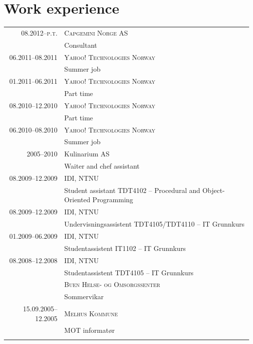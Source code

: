 \documentclass[a4paper,10pt]{article}
\begin{document}
\section{Work experience}
\begin{longtable}{r|p{11cm}}

\textsc{08.2012--p.t.} & \textsc{Capgemini Norge AS} \\
& \footnotesize{Consultant} \\

\textsc{06.2011--08.2011} & \textsc{Yahoo! Technologies Norway} \\
& \footnotesize{Summer job} \\

\textsc{01.2011--06.2011} & \textsc{Yahoo! Technologies Norway} \\
& \footnotesize{Part time} \\

\textsc{08.2010--12.2010} & \textsc{Yahoo! Technologies Norway} \\
& \footnotesize{Part time}\\

\textsc{06.2010--08.2010} & \textsc{Yahoo! Technologies Norway} \\
& \footnotesize{Summer job}\\

\textsc{2005--2010} & Kulinarium AS \\
& \footnotesize{Waiter and chef assistant} \\

\textsc{08.2009--12.2009} & \textsc{IDI, NTNU} \\
& \footnotesize{Student assistant TDT4102 -- Procedural and Object-Oriented Programming} \\%

\textsc{08.2009--12.2009} & \textsc{IDI, NTNU} \\
& \footnotesize{Undervisningsassistent TDT4105/TDT4110 -- IT Grunnkurs}\\

\textsc{01.2009--06.2009} & \textsc{IDI, NTNU} \\
& \footnotesize{Studentassistent IT1102 -- IT Grunnkurs}\\

\textsc{08.2008--12.2008} & \textsc{IDI, NTNU} \\
& \footnotesize{Studentassistent TDT4105 -- IT Grunnkurs}\\

\end{longtable}
\end{document}
